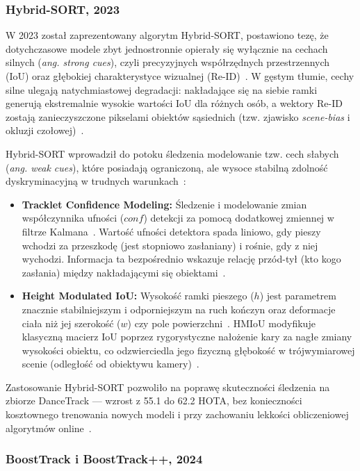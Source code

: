 \subsubsection{Hybrid-SORT, 2023}

W 2023 został zaprezentowany algorytm Hybrid-SORT, postawiono tezę, że dotychczasowe modele zbyt
jednostronnie opierały się wyłącznie na cechach silnych (\textit{ang. strong cues}), czyli
precyzyjnych współrzędnych przestrzennych (IoU) oraz głębokiej charakterystyce wizualnej
(Re-ID)~\cite{yang2024hybridsort}. W gęstym tłumie, cechy silne ulegają natychmiastowej degradacji:
nakładające się na siebie ramki generują ekstremalnie wysokie wartości IoU dla różnych osób, a
wektory Re-ID zostają zanieczyszczone pikselami obiektów sąsiednich (tzw. zjawisko
\textit{scene-bias} i okluzji czołowej)~\cite{yang2024hybridsort}.

Hybrid-SORT wprowadził do potoku śledzenia modelowanie tzw. cech słabych (\textit{ang. weak cues}),
które posiadają ograniczoną, ale wysoce stabilną zdolność dyskryminacyjną w trudnych
warunkach~\cite{yang2024hybridsort}:
\begin{itemize}
  \item \textbf{Tracklet Confidence Modeling:} Śledzenie i modelowanie zmian współczynnika ufności ($conf$) detekcji za pomocą dodatkowej zmiennej w filtrze Kalmana~\cite{yang2024hybridsort}. Wartość ufności detektora spada liniowo, gdy pieszy wchodzi za przeszkodę (jest stopniowo zasłaniany) i rośnie, gdy z niej wychodzi. Informacja ta bezpośrednio wskazuje relację przód-tył (kto kogo zasłania) między nakładającymi się obiektami~\cite{yang2024hybridsort}.
  \item \textbf{Height Modulated IoU:} Wysokość ramki pieszego ($h$) jest parametrem znacznie stabilniejszym i odporniejszym na ruch kończyn oraz deformacje ciała niż jej szerokość ($w$) czy pole powierzchni~\cite{yang2024hybridsort}. HMIoU modyfikuje klasyczną macierz IoU poprzez rygorystyczne nałożenie kary za nagłe zmiany wysokości obiektu, co odzwierciedla jego fizyczną głębokość w trójwymiarowej scenie (odległość od obiektywu kamery)~\cite{yang2024hybridsort}.
\end{itemize}

Zastosowanie Hybrid-SORT pozwoliło na poprawę skuteczności śledzenia na zbiorze DanceTrack ---
wzrost z 55.1 do 62.2 HOTA, bez konieczności kosztownego trenowania nowych modeli i przy zachowaniu
lekkości obliczeniowej algorytmów online~\cite{yang2024hybridsort}.

\subsubsection{BoostTrack i BoostTrack++, 2024}

